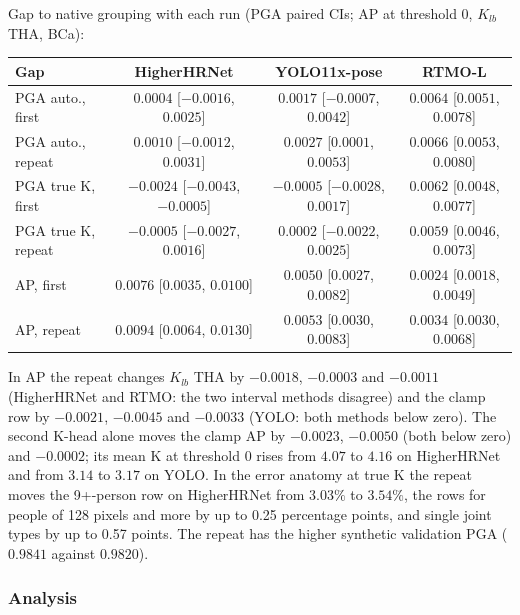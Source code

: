 \vspace{0.5em}

Gap to native grouping with each run (PGA paired CIs; AP at threshold 0, $K_{lb}$ THA, BCa):

{\small\setlength{\tabcolsep}{4pt}
\begin{tabular}{lccc}
\hline
\textbf{Gap} & \textbf{HigherHRNet} & \textbf{YOLO11x-pose} & \textbf{RTMO-L} \\
\hline
PGA auto., first   & $0.0004$ [$-0.0016$, $0.0025$] & $0.0017$ [$-0.0007$, $0.0042$] & $0.0064$ [$0.0051$, $0.0078$] \\
PGA auto., repeat  & $0.0010$ [$-0.0012$, $0.0031$] & $0.0027$ [$0.0001$, $0.0053$] & $0.0066$ [$0.0053$, $0.0080$] \\
PGA true K, first  & $-0.0024$ [$-0.0043$, $-0.0005$] & $-0.0005$ [$-0.0028$, $0.0017$] & $0.0062$ [$0.0048$, $0.0077$] \\
PGA true K, repeat & $-0.0005$ [$-0.0027$, $0.0016$] & $0.0002$ [$-0.0022$, $0.0025$] & $0.0059$ [$0.0046$, $0.0073$] \\
AP, first          & $0.0076$ [$0.0035$, $0.0100$] & $0.0050$ [$0.0027$, $0.0082$] & $0.0024$ [$0.0018$, $0.0049$] \\
AP, repeat         & $0.0094$ [$0.0064$, $0.0130$] & $0.0053$ [$0.0030$, $0.0083$] & $0.0034$ [$0.0030$, $0.0068$] \\
\hline
\end{tabular}
}

\vspace{0.5em}

In AP the repeat changes $K_{lb}$ THA by $-0.0018$, $-0.0003$ and $-0.0011$ (HigherHRNet and RTMO: the two interval methods disagree) and the clamp row by $-0.0021$, $-0.0045$ and $-0.0033$ (YOLO: both methods below zero).
The second K-head alone moves the clamp AP by $-0.0023$, $-0.0050$ (both below zero) and $-0.0002$; its mean K at threshold 0 rises from $4.07$ to $4.16$ on HigherHRNet and from $3.14$ to $3.17$ on YOLO.
In the error anatomy at true K the repeat moves the 9+-person row on HigherHRNet from $3.03\%$ to $3.54\%$, the rows for people of 128 pixels and more by up to 0.25 percentage points, and single joint types by up to 0.57 points.
The repeat has the higher synthetic validation PGA ($0.9841$ against $0.9820$).

\subsubsection{Analysis}

